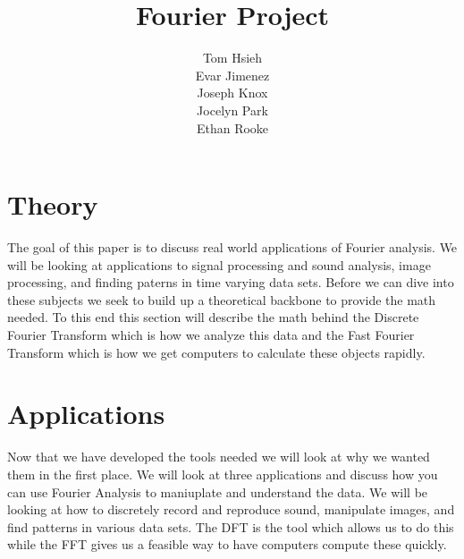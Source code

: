 \documentclass[11pt]{report}
\title{Fourier Project}
\author{Tom Hsieh\\
        Evar Jimenez\\
        Joseph Knox\\
        Jocelyn Park \\
        Ethan Rooke }
\begin{document}
\maketitle

\tableofcontents

\chapter{Theory}
  The goal of this paper is to discuss real world applications
  of Fourier analysis. We will be looking at applications to
  signal processing and sound analysis, image processing, and
  finding paterns in time varying data sets. Before we can
  dive into these subjects we seek to build up a theoretical
  backbone to provide the math needed. To this end this
  section will describe the math behind the Discrete Fourier Transform
  which is how we analyze this data and the Fast Fourier Transform
  which is how we get computers to calculate these objects rapidly.
  
  
\chapter{Applications}
  Now that we have developed the tools needed we will look at
  why we wanted them in the first place. We will look at three
  applications and discuss how you can use Fourier Analysis to
  maniuplate and understand the data. We will be looking at how
  to discretely record and reproduce sound, manipulate images,
  and find patterns in various data sets. The DFT is the tool
  which allows us to do this while the FFT gives us a feasible
  way to have computers compute these quickly.
  
  
  

  \nocite{*} %
  \printbibliography
\end{document}
